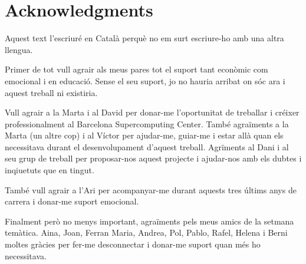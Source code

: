 \chapter*{Acknowledgments}
%

Aquest text l'escriuré en Català perquè no em surt escriure-ho amb una altra llengua.

Primer de tot vull agrair als meus pares tot el suport tant econòmic com emocional i en educació. Sense el seu suport, jo no hauria arribat on sóc ara i aquest treball ni existiria.

Vull agrair a la Marta i al David per donar-me l'oportunitat de treballar i créixer professionalment al Barcelona Supercomputing Center. També agraïments a la Marta (un altre cop) i al Víctor per ajudar-me, guiar-me i estar allà quan els necessitava durant el desenvolupament d'aquest treball. Agrïments al Dani i al seu grup de treball per proposar-nos aquest projecte i ajudar-nos amb els dubtes i inqiuetuts que en tingut.

També vull agrair a l'Ari per acompanyar-me durant aquests tres últims anys de carrera i donar-me suport emocional.

Finalment però no menys important, agraïments pels meus amics de la setmana temàtica. Aina, Joan, Ferran Maria, Andrea, Pol, Pablo, Rafel, Helena i Berni moltes gràcies per fer-me desconnectar i donar-me suport quan més ho necessitava.

